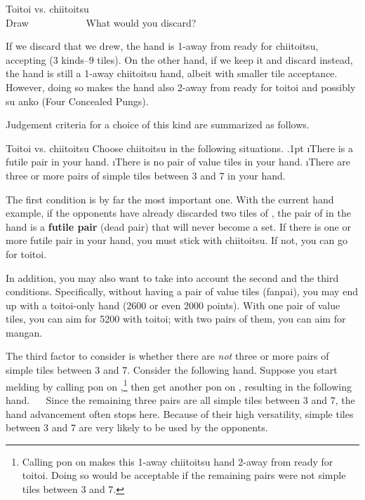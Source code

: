 \bigskip
\begin{itembox}[r]{{\jap Toitoi} vs. {\jap chiitoitsu}}
\bp
{}\fa\fa\bei~\\
\hfill\footnotesize{Draw~~~~~~~~~~~}
\ep
\vspace{-17pt}What would you discard? \vspace{-5pt}
\end{itembox}

\bigskip
\noindent If we discard {\LARGE{}} that we drew, the hand is 1-away from ready for {\jap chiitoitsu}, accepting {\LARGE{}\bei} (3 kinds--9 tiles). On the other hand, if we keep it and discard {\LARGE{}} instead, the hand is still a 1-away {\jap chiitoitsu} hand, albeit with smaller tile acceptance. However, doing so makes the hand also 2-away from ready for {\jap toitoi} and possibly {\jap su anko} (Four Concealed Pungs). 

\bigskip
\noindent Judgement criteria for a choice of this kind are summarized as follows.
\bigskip
\begin{itembox}[c]{{\jap Toitoi} vs. {\jap chiitoitsu}}
Choose {\jap chiitoitsu} in the following situations.
\be\itemsep.1pt
\i There is a futile pair in your hand.
\i There is no pair of value tiles in your hand.
\i There are three or more pairs of simple tiles between 3 and 7 in your hand.
\ee
\end{itembox}

\bigskip
\noindent The first condition is by far the most important one. With the current hand example, if the opponents have already discarded two tiles of {\LARGE{}}, the pair of {\LARGE{}} in the hand is a {\bf futile pair} (dead pair) that will never become a set. If there is one or more futile pair in your hand, you must stick with {\jap chiitoitsu}. If not, you can go for {\jap toitoi}. 

\bigskip
In addition, you may also want to take into account the second and the third conditions. Specifically, without having a pair of value tiles ({\jap fanpai}), you may end up with a {\jap toitoi}-only hand (2600 or even 2000 points). With one pair of value tiles, you can aim for 5200 with {\jap toitoi}; with two pairs of them, you can aim for {\jap mangan}. 

\bigskip
The third factor to consider is whether there are \emph{not} three or more pairs of simple tiles between 3 and 7. Consider the following hand. 
\bp
{}\bai\bai\fa\zhong
\ep
Suppose you start melding by calling {\jap pon} on {\LARGE\bai},\footnote{Calling {\jap pon} on {\bai} makes this 1-away {\jap chiitoitsu} hand 2-away from ready for {\jap toitoi}. Doing so would be acceptable if the remaining pairs were not simple tiles between 3 and 7.} then get another {\jap pon} on {\LARGE{}}, resulting in the following hand.
\bp
{}\zhong~~\bai\rbai\bai
\ep
Since the remaining three pairs are all simple tiles between 3 and 7, the hand advancement often stops here. Because of their high versatility, simple tiles between 3 and 7 are very likely to be used by the opponents. 

